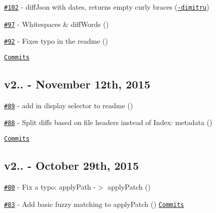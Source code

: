 \begin{DoxyItemize}
\item \href{https://github.com/kpdecker/jsdiff/issues/102}{\tt \#102} -\/ diff\+Json with dates, returns empty curly braces (\href{https://api.github.com/users/dr-dimitru}{\tt -\/dimitru})
\item \href{https://github.com/kpdecker/jsdiff/issues/97}{\tt \#97} -\/ Whitespaces \& diff\+Words (\href{https://api.github.com/users/faiwer}{\tt })
\item \href{https://github.com/kpdecker/jsdiff/pull/92}{\tt \#92} -\/ Fixes typo in the readme (\href{https://api.github.com/users/bg451}{\tt })
\end{DoxyItemize}

\href{https://github.com/kpdecker/jsdiff/compare/v2.2.1...v2.2.2}{\tt Commits}

\subsection*{v2.. -\/ November 12th, 2015}


\begin{DoxyItemize}
\item \href{https://github.com/kpdecker/jsdiff/pull/89}{\tt \#89} -\/ add in display selector to readme (\href{https://api.github.com/users/FranDias}{\tt })
\item \href{https://github.com/kpdecker/jsdiff/pull/88}{\tt \#88} -\/ Split diffs based on file headers instead of \textquotesingle{}Index\+:\textquotesingle{} metadata (\href{https://api.github.com/users/piranna}{\tt })
\end{DoxyItemize}

\href{https://github.com/kpdecker/jsdiff/compare/v2.2.0...v2.2.1}{\tt Commits}

\subsection*{v2.. -\/ October 29th, 2015}


\begin{DoxyItemize}
\item \href{https://github.com/kpdecker/jsdiff/pull/80}{\tt \#80} -\/ Fix a typo\+: apply\+Path -\/$>$ apply\+Patch (\href{https://api.github.com/users/fluxxu}{\tt })
\item \href{https://github.com/kpdecker/jsdiff/pull/83}{\tt \#83} -\/ Add basic fuzzy matching to apply\+Patch (\href{https://github.com/piranna}{\tt }) \href{https://github.com/kpdecker/jsdiff/compare/v2.2.0...v2.2.0}{\tt Commits}
\end{DoxyItemize}

